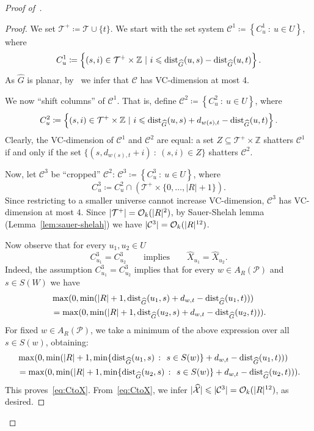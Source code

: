 \begin{proof}[Proof of~]
  \begin{proof}
  We set $\mathcal{T}^+\coloneqq \mathcal{T}\cup \{t\}$.
  We start with the set system $\mathcal{C}^1\coloneqq\left\{C_u^1~\colon~u \in U\right\}$, where
  $$C_u^1\coloneqq\left\{(s,i) \in \mathcal{T}^+ \times \mathbb{Z}~|~i \leqslant \mathrm{dist}_{\widehat{G}}(u,s)-\mathrm{dist}_{\widehat{G}}(u,t)\right\}.$$
  As $\widehat{G}$ is planar, by~ we infer that $\mathcal{C}$ has VC-dimension at most 4.

  We now ``shift columns'' of $\mathcal{C}^1$. That is, define $\mathcal{C}^2 \coloneqq \left\{C_u^2~\colon~u \in U\right\}$, where
  $$C_u^2\coloneqq\left\{(s,i) \in \mathcal{T}^+ \times \mathbb{Z}~|~i \leqslant \mathrm{dist}_{\widehat{G}}(u,s)+d_{w(s),t}-\mathrm{dist}_{\widehat{G}}(u,t)\right\}.$$
  Clearly, the VC-dimension of $\mathcal{C}^1$ and $\mathcal{C}^2$ are equal: a set $Z \subseteq \mathcal{T}^+ \times \mathbb{Z}$
  shatters $\mathcal{C}^1$ if and only if the set $\{(s,d_{w(s),t}+i)~\colon~(s,i) \in Z\}$ shatters $\mathcal{C}^2$. 

  Now, let $\mathcal{C}^3$ be ``cropped'' $\mathcal{C}^2$:
  $\mathcal{C}^3 \coloneqq \left\{ C_u^3~\colon~u \in U\right\}$, where
  \[ C_u^3 \coloneqq C_u^2 \cap \left(\mathcal{T}^+ \times \{0,\ldots, |R|+1\}\right). \]
  Since restricting to a smaller universe cannot increase VC-dimension, $\mathcal{C}^3$ has VC-dimension at most $4$. 
  Since $|\mathcal{T}^+| = \mathcal{O}_k(|R|^2)$, by Sauer-Shelah lemma (Lemma~\ref{lem:sauer-shelah})
  we have $|\mathcal{C}^3| = \mathcal{O}_k(|R|^{12})$. 

  Now observe that for every $u_1,u_2 \in U$
  \begin{equation}\label{eq:CtoX}
   C^3_{u_1} = C^3_{u_2} \qquad \mathrm{implies} \qquad \widehat{X}_{u_1} = \widehat{X}_{u_2}. 
  \end{equation}
  Indeed, the assumption $C^3_{u_1} = C^3_{u_2}$ implies that
  for every $w \in A_R(\mathcal{P})$ and $s \in S(W)$ we have
  \begin{align*}
  & \max(0, \min(|R|+1, \mathrm{dist}_{\widehat{G}}(u_1,s)+d_{w,t}-\mathrm{dist}_{\widehat{G}}(u_1,t))) \\ 
  &= \max(0, \min(|R|+1, \mathrm{dist}_{\widehat{G}}(u_2,s)+d_{w,t}-\mathrm{dist}_{\widehat{G}}(u_2,t))).
\end{align*} 
  For fixed $w \in A_R(\mathcal{P})$, we take a minimum of the above expression over all $s \in S(w)$, obtaining:
  \begin{align*}
    & \max(0, \min(|R|+1, \min\{\mathrm{dist}_{\widehat{G}}(u_1,s)~\colon~s \in S(w)\}+d_{w,t}-\mathrm{dist}_{\widehat{G}}(u_1,t))) \\ 
    &= \max(0, \min(|R|+1, \min\{\mathrm{dist}_{\widehat{G}}(u_2,s)~\colon~s \in S(w)\}+d_{w,t}-\mathrm{dist}_{\widehat{G}}(u_2,t))).
  \end{align*} 
  This proves~\eqref{eq:CtoX}.
  From~\eqref{eq:CtoX}, we infer $|\widehat{\mathcal{X}}| \leqslant |\mathcal{C}^3| = \mathcal{O}_k(|R|^{12})$, as desired.
  \end{proof}


\end{proof}
